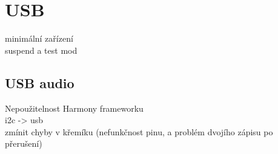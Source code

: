 \section{USB}
\label{sec:USB}
minimální zařízení\\
suspend a test mod

\subsection{USB audio}
Nepoužitelnost Harmony frameworku\\
i2c -> usb\\
	zmínit chyby v křemíku (nefunkčnost pinu, a problém dvojího zápisu po přerušení)
